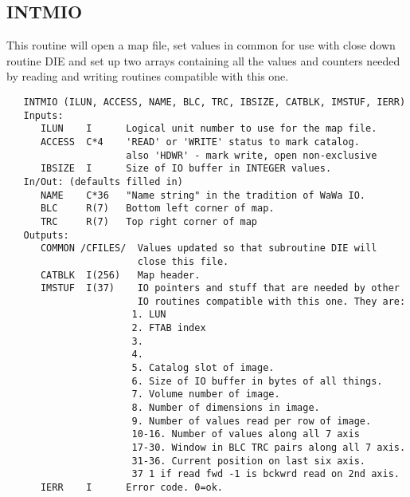 \subsection{INTMIO}
This routine will open a map file, set values in common for use with
close down routine DIE and set up two arrays containing all the
values and counters needed by reading and writing routines
compatible with this one.
\begin{verbatim}
   INTMIO (ILUN, ACCESS, NAME, BLC, TRC, IBSIZE, CATBLK, IMSTUF, IERR)
   Inputs:
      ILUN    I      Logical unit number to use for the map file.
      ACCESS  C*4    'READ' or 'WRITE' status to mark catalog.
                     also 'HDWR' - mark write, open non-exclusive
      IBSIZE  I      Size of IO buffer in INTEGER values.
   In/Out: (defaults filled in)
      NAME    C*36   "Name string" in the tradition of WaWa IO.
      BLC     R(7)   Bottom left corner of map.
      TRC     R(7)   Top right corner of map
   Outputs:
      COMMON /CFILES/  Values updated so that subroutine DIE will
                       close this file.
      CATBLK  I(256)   Map header.
      IMSTUF  I(37)    IO pointers and stuff that are needed by other
                       IO routines compatible with this one. They are:
                      1. LUN
                      2. FTAB index
                      3.
                      4.
                      5. Catalog slot of image.
                      6. Size of IO buffer in bytes of all things.
                      7. Volume number of image.
                      8. Number of dimensions in image.
                      9. Number of values read per row of image.
                      10-16. Number of values along all 7 axis
                      17-30. Window in BLC TRC pairs along all 7 axis.
                      31-36. Current position on last six axis.
                      37 1 if read fwd -1 is bckwrd read on 2nd axis.
      IERR    I      Error code. 0=ok.

\end{verbatim}

